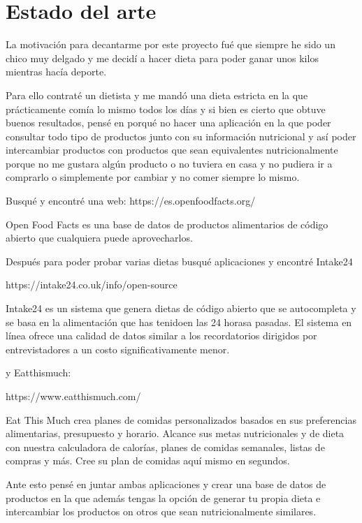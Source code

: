 \chapter{Estado del arte}

La motivación para decantarme por este proyecto fué que siempre he sido un chico muy delgado y me decidí a hacer dieta para poder ganar unos kilos mientras hacía deporte.

Para ello contraté un dietista y me mandó una dieta estricta en la que prácticamente comía lo mismo todos los días y si bien es cierto que obtuve buenos resultados, pensé 
en porqué no hacer una aplicación en la que poder consultar todo tipo de productos junto con su información nutricional y así poder intercambiar productos con productos que 
sean equivalentes nutricionalmente porque no me gustara algún producto o no tuviera en casa y no pudiera ir a comprarlo o simplemente por cambiar y no comer siempre lo mismo.

Busqué y encontré una web: https://es.openfoodfacts.org/

Open Food Facts es una base de datos de productos alimentarios de código abierto que cualquiera puede aprovecharlos.

Después para poder probar varias dietas busqué aplicaciones y encontré Intake24

https://intake24.co.uk/info/open-source

Intake24 es un sistema que genera dietas de código abierto que se autocompleta y se basa en la alimentación que has tenidoen las 24 horasa pasadas. 
El sistema en línea ofrece una calidad de datos similar a los recordatorios dirigidos por entrevistadores a un costo significativamente menor.

y Eatthismuch:

https://www.eatthismuch.com/

Eat This Much crea planes de comidas personalizados basados ​​en sus preferencias alimentarias, presupuesto y horario. Alcance sus metas nutricionales y 
de dieta con nuestra calculadora de calorías, planes de comidas semanales, listas de compras y más. Cree su plan de comidas aquí mismo en segundos.

Ante esto pensé en juntar ambas aplicaciones y crear una base de datos de productos en la que además tengas la opción de generar tu propia dieta e intercambiar
los productos on otros que sean nutricionalmente similares.
